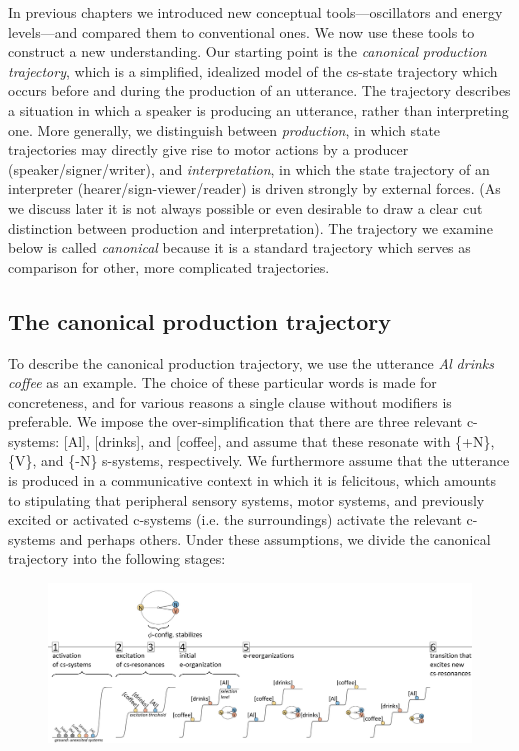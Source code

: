 In previous chapters we introduced new conceptual tools—oscillators and energy levels—and compared them to conventional ones. We now use these tools to construct a new understanding. Our starting point is the \textit{canonical} \textit{production} \textit{trajectory}, which is a simplified, idealized model of the cs-state trajectory which occurs before and during the production of an utterance. The trajectory describes a situation in which a speaker is producing an utterance, rather than interpreting one. More generally, we distinguish between \textit{production}, in which state trajectories may directly give rise to motor actions by a producer (speaker/signer/writer), and \textit{interpretation}, in which the state trajectory of an interpreter (hearer/sign-viewer/reader) is driven strongly by external forces. (As we discuss later it is not always possible or even desirable to draw a clear cut distinction between production and interpretation). The trajectory we examine below is called \textit{canonical} because it is a standard trajectory which serves as comparison for other, more complicated trajectories.

\subsection{The canonical production trajectory}

To describe the canonical production trajectory, we use the utterance \textit{Al} \textit{drinks} \textit{coffee} as an example. The choice of these particular words is made for concreteness, and for various reasons a single clause without modifiers is preferable. We impose the over-simplification that there are three relevant c-systems: [Al], [drinks], and [coffee], and assume that these resonate with \{+N\}, \{V\}, and \{-N\} s-systems, respectively. We furthermore assume that the utterance is produced in a communicative context in which it is felicitous, which amounts to stipulating that peripheral sensory systems, motor systems, and previously excited or activated c-systems (i.e. the surroundings) activate the relevant c-systems and perhaps others. Under these assumptions, we divide the canonical trajectory into the following stages:

  
\begin{figure}
\includegraphics[width=\textwidth]{figures/Tilsen-img51.png}
\caption{\missingcaption}
\label{fig:}
\end{figure}
 

